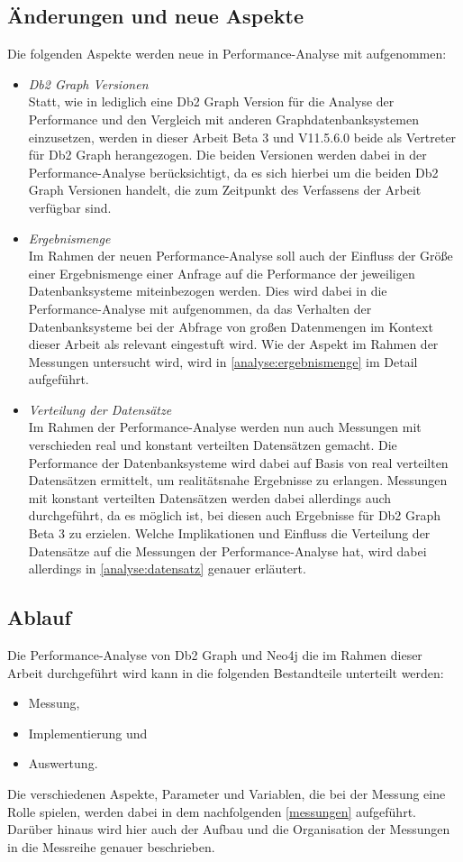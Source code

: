\subsection{Änderungen und neue Aspekte}
Die folgenden Aspekte werden neue in Performance-Analyse mit aufgenommen:
\begin{itemize}
    \item \textit{Db2 Graph Versionen}\\
    Statt, wie in \cite{sigmod_tian} lediglich eine Db2 Graph Version für die Analyse der Performance und den Vergleich mit anderen Graphdatenbanksystemen einzusetzen, werden in dieser Arbeit Beta 3 und V11.5.6.0 beide als Vertreter für Db2 Graph herangezogen. Die beiden Versionen werden dabei in der Performance-Analyse berücksichtigt, da es sich hierbei um die beiden Db2 Graph Versionen handelt, die zum Zeitpunkt des Verfassens der Arbeit verfügbar sind.
    \item \textit{Ergebnismenge}\\
    Im Rahmen der neuen Performance-Analyse soll auch der Einfluss der Größe einer Ergebnismenge einer Anfrage auf die Performance der jeweiligen Datenbanksysteme miteinbezogen werden. Dies wird dabei in die Performance-Analyse mit aufgenommen, da das Verhalten der Datenbanksysteme bei der Abfrage von großen Datenmengen im Kontext dieser Arbeit als relevant eingestuft wird. Wie der Aspekt im Rahmen der Messungen untersucht wird, wird in \autoref{analyse:ergebnismenge} im Detail aufgeführt.
    \item \textit{Verteilung der Datensätze}\\
    Im Rahmen der Performance-Analyse werden nun auch Messungen mit verschieden real und konstant verteilten Datensätzen gemacht. Die Performance der Datenbanksysteme wird dabei auf Basis von real verteilten Datensätzen ermittelt, um realitätsnahe Ergebnisse zu erlangen. Messungen mit konstant verteilten Datensätzen werden dabei allerdings auch durchgeführt, da es möglich ist, bei diesen auch Ergebnisse für Db2 Graph Beta 3 zu erzielen. Welche Implikationen und Einfluss die Verteilung der Datensätze auf die Messungen der Performance-Analyse hat, wird dabei allerdings in \autoref{analyse:datensatz} genauer erläutert. 
\end{itemize}

\subsection{Ablauf}
Die Performance-Analyse von Db2 Graph und Neo4j die im Rahmen dieser Arbeit durchgeführt wird kann in die folgenden Bestandteile unterteilt werden: 
\begin{itemize}
    \item Messung,
    \item Implementierung und 
    \item Auswertung.
\end{itemize}
Die verschiedenen Aspekte, Parameter und Variablen, die bei der Messung eine Rolle spielen, werden dabei in dem nachfolgenden \autoref{messungen} aufgeführt. Darüber hinaus wird hier auch der Aufbau und die Organisation der Messungen in die Messreihe genauer beschrieben. 

